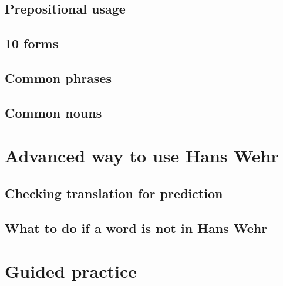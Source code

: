 \subsection{Prepositional usage}
\subsection{10 forms}
\subsection{Common phrases}
\subsection{Common nouns}


\section{Advanced way to use Hans Wehr}
\subsection{Checking translation for prediction}
\subsection{What to do if a word is not in Hans Wehr}
\section{Guided practice}

